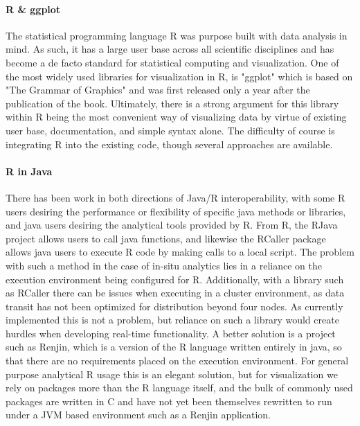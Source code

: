 \paragraph{R \& ggplot}
The statistical programming language R was purpose built with data analysis in mind. As such, it has a large user base across all scientific disciplines and has become a de facto standard for statistical computing and visualization. One of the most widely used libraries for visualization in R, is "ggplot" \cite{Wickham2006} which is based on "The Grammar of Graphics" and was first released only a year after the publication of the book. Ultimately, there is a strong argument for this library within R being the most convenient way of visualizing data by virtue of existing user base, documentation, and simple syntax alone. The difficulty of course is integrating R into the existing code, though several approaches are available. 

\paragraph{R in Java}
There has been work in both directions of Java/R interoperability, with some R users desiring the performance or flexibility of specific java methods or libraries, and java users desiring the analytical tools provided by R. From R, the RJava project allows users to call java functions, and likewise the RCaller package allows java users to execute R code by making calls to a local script. The problem with such a method in the case of in-situ analytics lies in a reliance on the execution environment being configured for R. Additionally, with a library such as RCaller there can be issues when executing in a cluster environment, as data transit has not been optimized for distribution beyond four nodes. As currently implemented this is not a problem, but reliance on such a library would create hurdles when developing real-time functionality. A better solution is a project such as Renjin, which is a version of the R language written entirely in java, so that there are no requirements placed on the execution environment. For general purpose analytical R usage this is an elegant solution, but for visualization we rely on packages more than the R language itself, and the bulk of commonly used packages are written in C and have not yet been themselves rewritten to run under a JVM based environment such as a Renjin application.

